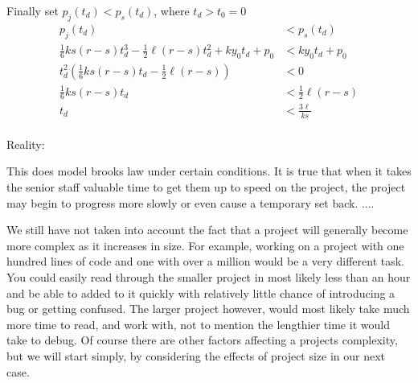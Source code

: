\documentclass{article}
\newenvironment{atomize}
    {\begin{list} {} {
            \setlength\itemindent{0pt}
            \setlength\leftmargin{10pt}
            \setlength\labelwidth{0pt}
    }}
    {\end{list}}
\begin{document}
\begin{atomize}
\begin{atomize}
        \item Finally set $p_{j}(t_{d}) < p_{s}(t_{d})$, where 
        $t_{d} > t_{0} = 0$
          \begin{align*}
            p_{j}(t_{d}) &< p_{s}(t_{d}) \\[6pt]
            \frac{1}{6}ks(r - s)t_{d}^{3} - \frac{1}{2}\ell(r - s)t_{d}^{2}
            + ky_{0}t_{d}  + p_{0} &< ky_{0}t_{d} + p_{0} \\[6pt]
            t_{d}^{2}\left(\frac{1}{6}ks(r - s)t_{d}
            - \frac{1}{2}\ell(r - s)\right) &< 0 \\[6pt]
            \frac{1}{6}ks(r - s)t_{d}
            &< \frac{1}{2}\ell(r - s) \\[6pt]
            t_{d}
            &< \frac{3\ell}{ks} \\[6pt]
          \end{align*}

      \end{atomize}

    \item Reality:
      \begin{atomize}
          \item This does model brooks law under certain conditions. It is 
          true that when it takes the senior staff valuable time to get them
          up to speed on the project, the project may begin to progress more
          slowly or even cause a temporary set back. ....

          We still have not taken into account the fact that a project will
          generally become more complex as it increases in size. For example,
          working on a project with one hundred lines of code and one with over
          a million would be a very different task. You could easily read
          through the smaller project in most likely less than an hour and be
          able to added to it quickly with relatively little chance of
          introducing a bug or getting confused. The larger project however,
          would most likely take much more time to read, and work with, not to
          mention the lengthier time it would take to debug. Of course there 
          are other factors affecting a projects complexity, but we will start
          simply, by considering the effects of project size in our next case.
          \end{atomize}

  \end{atomize}
\end{document}
